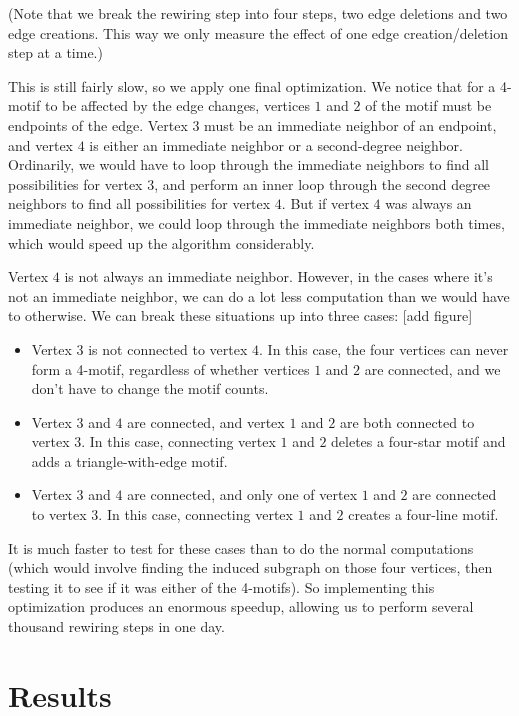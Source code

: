 \documentclass[12pt]{article}
\begin{document}
(Note that we break the rewiring step into four steps, two edge deletions and two edge creations.  This way we only measure the effect of one edge creation/deletion step at a time.)

This is still fairly slow, so we apply one final optimization.  We notice that for a 4-motif to be affected by the edge changes, vertices $1$ and $2$ of the motif must be endpoints of the edge.  Vertex $3$ must be an immediate neighbor of an endpoint, and vertex $4$ is either an immediate neighbor or a second-degree neighbor.  Ordinarily, we would have to loop through the immediate neighbors to find all possibilities for vertex $3$, and perform an inner loop through the second degree neighbors to find all possibilities for vertex $4$.  But if vertex $4$ was always an immediate neighbor, we could loop through the immediate neighbors both times, which would speed up the algorithm considerably.

Vertex $4$ is not always an immediate neighbor.  However, in the cases where it's not an immediate neighbor, we can do a lot less computation than we would have to otherwise.  We can break these situations up into three cases: [add figure]

\begin{itemize}
\item Vertex $3$ is not connected to vertex $4$.  In this case, the four vertices can never form a 4-motif, regardless of whether vertices $1$ and $2$ are connected, and we don't have to change the motif counts.
\item Vertex $3$ and $4$ are connected, and vertex $1$ and $2$ are both connected to vertex $3$.  In this case, connecting vertex $1$ and $2$ deletes a four-star motif and adds a triangle-with-edge motif.
\item Vertex $3$ and $4$ are connected, and only one of vertex $1$ and $2$ are connected to vertex $3$.  In this case, connecting vertex $1$ and $2$ creates a four-line motif.
\end{itemize}

It is much faster to test for these cases than to do the normal computations (which would involve finding the induced subgraph on those four vertices, then testing it to see if it was either of the 4-motifs).  So implementing this optimization produces an enormous speedup, allowing us to perform several thousand rewiring steps in one day.

\section{Results}
\end{document}
